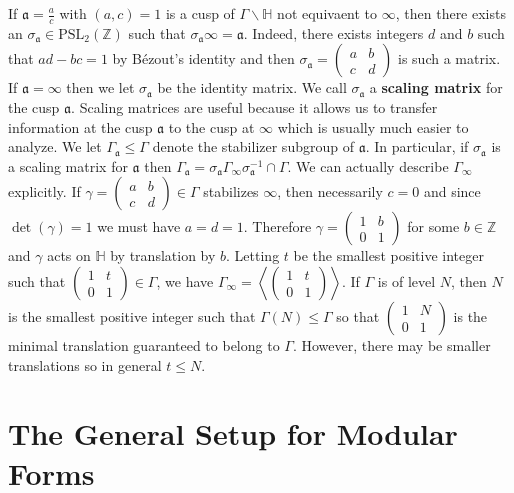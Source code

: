 \documentclass[12pt]{book}
\theoremstyle{definition}\newframedtheorem{method}{Method}
\newcommand{\mf}{\mathfrak}
\newcommand{\PSL}{\mathrm{PSL}}
\newcommand{\Z}{\mathbb{Z}}
\renewcommand{\H}{\mathbb{H}}
\newcommand{\g}{\gamma}
\newcommand{\s}{\sigma}
\newcommand{\G}{\Gamma}
\newcommand{\<}{\langle}
\renewcommand{\>}{\rangle}
\newcommand{\GH}{\G\backslash\H}
\begin{document}
      If $\mf{a} = \frac{a}{c}$ with $(a,c) = 1$ is a cusp of $\GH$ not equivaent to $\infty$, then there exists an $\s_{\mf{a}} \in \PSL_{2}(\Z)$ such that $\s_{\mf{a}}\infty = \mf{a}$. Indeed, there exists integers $d$ and $b$ such that $ad-bc = 1$ by B\'ezout's identity and then $\s_{\mf{a}} = \begin{pmatrix} a & b \\ c & d \end{pmatrix}$ is such a matrix. If $\mf{a} = \infty$ then we let $\s_{\mf{a}}$ be the identity matrix. We call $\s_{\mf{a}}$ a \textbf{scaling matrix} for the cusp $\mf{a}$. Scaling matrices are useful because it allows us to transfer information at the cusp $\mf{a}$ to the cusp at $\infty$ which is usually much easier to analyze. We let $\G_{\mf{a}} \le \G$ denote the stabilizer subgroup of $\mf{a}$. In particular, if $\s_{\mf{a}}$ is a scaling matrix for $\mf{a}$ then $\G_{\mf{a}} = \s_{\mf{a}}\G_{\infty}\s_{\mf{a}}^{-1} \cap \G$. We can actually describe $\G_{\infty}$ explicitly. If $\g = \begin{pmatrix} a & b \\ c & d \end{pmatrix} \in \G$ stabilizes $\infty$, then necessarily $c = 0$ and since $\det(\g) = 1$ we must have $a = d = 1$. Therefore $\g = \begin{pmatrix} 1 & b \\ 0 & 1 \end{pmatrix}$ for some $b \in \Z$ and $\g$ acts on $\H$ by translation by $b$. Letting $t$ be the smallest positive integer such that $\begin{pmatrix} 1 & t \\ 0 & 1 \end{pmatrix} \in \G$, we have $\G_{\infty} = \left\<\begin{pmatrix} 1 & t \\ 0 & 1 \end{pmatrix}\right\>$. If $\G$ is of level $N$, then $N$ is the smallest positive integer such that $\G(N) \le \G$ so that $\begin{pmatrix} 1 & N \\ 0 & 1 \end{pmatrix}$ is the minimal translation guaranteed to belong to $\G$. However, there may be smaller translations so in general $t \le N$.
  \section{The General Setup for Modular Forms}\label{sec:The_General_Setup_for_Modular_Forms}
\end{document}
